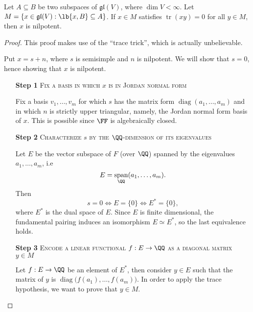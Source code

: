 \documentclass{article}
\DeclarePairedDelimiter\lb\lbrack\rbrack
\DeclareMathOperator{\tr}{tr}
\DeclareMathOperator{\diag}{diag}
\DeclareMathOperator{\opspan}{span}
\newcommand*\gl{\ensuremath{\mathfrak{gl}}}
\begin{document}
\begin{lemma}
    \label{lem:TraceNilpotence}
    Let $A \subseteq B$ be two subspaces of $\gl(V)$, where $\dim V < \infty$.
    Let $M = \{x \in \gl(V) : \lb{x,B} \subseteq A\}$.
    If $x \in M$ satisfies $\tr(xy) = 0$ for all $y \in M$, then $x$ is nilpotent.
\end{lemma}
\begin{proof}
    This proof makes use of the ``trace trick'', which is actually unbelievable.

    Put $x = s + n$, where $s$ is semisimple and $n$ is nilpotent.
    We will show that $s=0$, hence showing that $x$ is nilpotent.
    \begin{itemize}
        \item[\textbf{Step 1}]
            \textsc{\color{Crimson} Fix a basis in which $x$ is in Jordan normal form}

            Fix a basis $v_1,\ldots,v_m$ for which $s$ has the matrix form $\diag(a_1,\ldots,a_m)$ and in which $n$ is strictly upper triangular, namely, the Jordan normal form basis of $x$.
            This is possible since $\FF$ is algebraically closed.

        \item[\textbf{Step 2}]
            \textsc{\color{Crimson} Characterize $s$ by the $\QQ$-dimension of its eigenvalues}

            Let $E$ be the vector subspace of $F$ (over $\QQ$) spanned by the eigenvalues $a_1,\ldots,a_m$, i.e
            \[
                E = \opspan_\QQ(a_1,\ldots,a_m).
            \]
            Then
            \[
                s = 0 \iff E = \{0\} \iff E^\ast = \{0\},
            \]
            where $E^\ast$ is the dual space of $E$.
            Since $E$ is finite dimensional, the fundamental pairing induces an isomorphism $E \simeq E^\ast$, so the last equivalence holds.

        \item[\textbf{Step 3}]
            \textsc{\color{Crimson} Encode a linear functional $f: E \to \QQ$ as a diagonal matrix $y \in M$}

            Let $f: E \to \QQ$ be an element of $E^\ast$, then consider $y \in E$ such that the matrix of $y$ is $\diag\big(f(a_1),\ldots,f(a_m)\big)$.
            In order to apply the trace hypothesis, we want to prove that $y \in M$.


\end{itemize}
\end{proof}
\end{document}
